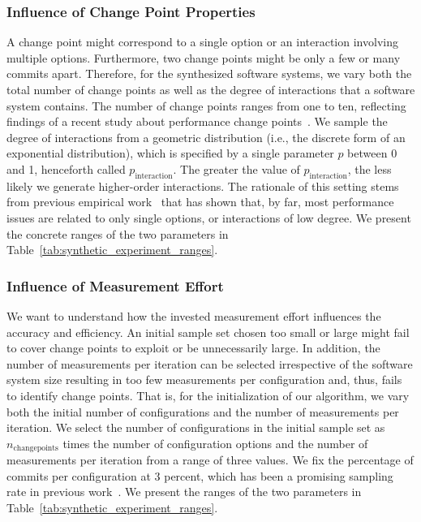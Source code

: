 \documentclass[sigconf]{acmart}
\begin{document}
	\subsubsection{Influence of Change Point Properties}
	A change point might correspond to a single option or an interaction involving multiple options. Furthermore, two change points might be only a few or many commits apart. Therefore, for the synthesized software systems, we vary both the total number of change points as well as the degree of interactions that a software system contains. The number of change points ranges from one to ten, reflecting findings of a recent study about performance change points~\cite{muhlbauer_accurate_2019}. We sample the degree of interactions from a geometric distribution (i.e., the discrete form of an exponential distribution), which is specified by a single parameter $p$ between 0 and 1, henceforth called $p_\text{interaction}$. The greater the value of $p_\text{interaction}$, the less likely we generate higher-order interactions. The rationale of this setting stems from previous empirical work~\cite{medeiros_comparison_2016,kolesnikov_tradeoffs_2019} that has shown that, by far, most performance issues are related to only single options, or interactions of low degree. We present the concrete ranges of the two parameters in Table~\ref{tab:synthetic_experiment_ranges}.
	
	\subsubsection{Influence of Measurement Effort}
	We want to understand how the invested measurement effort influences the accuracy and efficiency. An initial sample set chosen too small or large might fail to cover change points to exploit or be unnecessarily large. In addition, the number of measurements per iteration can be selected irrespective of the software system size resulting in too few measurements per configuration and, thus, fails to identify change points. That is, for the initialization of our algorithm, we vary both the initial number of configurations and the number of measurements per iteration. We select the number of configurations in the initial sample set as $n_\text{changepoints}$ times the number of configuration options and the number of measurements per iteration from a range of three values. We fix the percentage of commits per configuration at 3 percent, which has been a promising sampling rate in previous work~\cite{muhlbauer_accurate_2019}. 
	We present the ranges of the two parameters in Table~\ref{tab:synthetic_experiment_ranges}.
	
\end{document}
